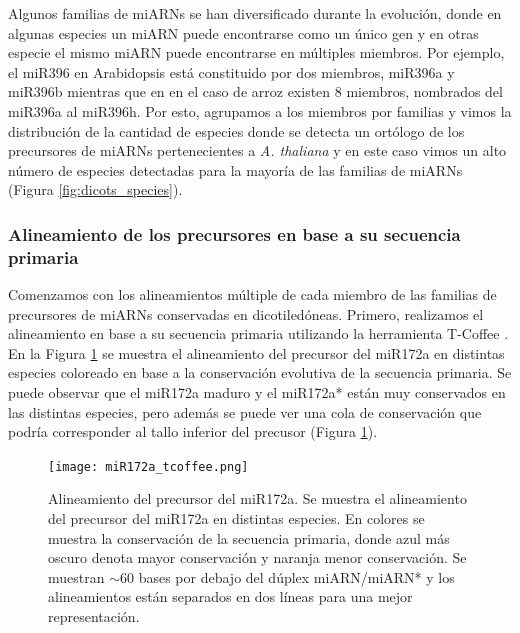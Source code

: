 Algunos familias de miARNs se han diversificado durante la evolución, donde en algunas especies un miARN puede encontrarse como un único gen y en otras especie el mismo miARN puede encontrarse en múltiples miembros.
Por ejemplo, el miR396 en Arabidopsis está constituido por dos miembros, miR396a y miR396b mientras que en en el caso de arroz existen 8 miembros, nombrados del miR396a al miR396h.
Por esto, agrupamos a los miembros por familias y vimos la distribución de la cantidad de especies donde se detecta un ortólogo de los precursores de miARNs pertenecientes a \textit{A. thaliana} y en este caso vimos un alto número de especies detectadas para la mayoría de las familias de miARNs (Figura \ref{fig:dicots_species}).

\subsubsection{Alineamiento de los precursores en base a su secuencia primaria}

Comenzamos con los alineamientos múltiple de cada miembro de las familias de precursores de miARNs conservadas en dicotiledóneas.
Primero, realizamos el alineamiento en base a su secuencia primaria utilizando la herramienta T-Coffee \citep{pmid10964570}.
En la Figura \ref{fig:miR172a_tcoffee} se muestra el alineamiento del precursor del miR172a en distintas especies coloreado en base a la conservación evolutiva de la secuencia primaria.
Se puede observar que el miR172a maduro y el miR172a* están muy conservados en las distintas especies, pero además se puede ver una cola de conservación que podría corresponder al tallo inferior del precusor (Figura \ref{fig:miR172a_tcoffee}).

\begin{landscape}
    \begin{figure}[htbp!] 
        \centering    
        \texttt{[image: miR172a\_tcoffee.png]}
        \caption[Alineamiento del precursor del miR172a.]{Alineamiento del precursor del miR172a. 
        Se muestra el alineamiento del precursor del miR172a en distintas especies. 
        En colores se muestra la conservación de la secuencia primaria, donde azul más oscuro denota mayor conservación y naranja menor conservación.
        Se muestran $\sim$60 bases por debajo del dúplex miARN/miARN* y los alineamientos están separados en dos líneas para una mejor representación.}
         \label{fig:miR172a_tcoffee}
    \end{figure}
\end{landscape}

